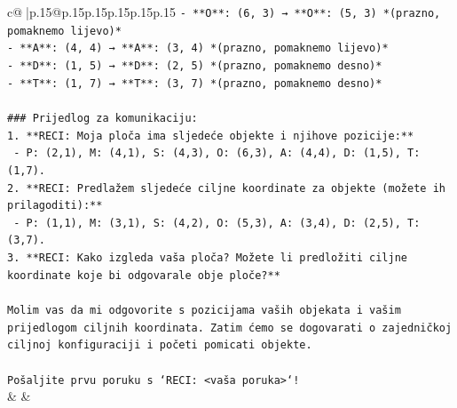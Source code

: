 \documentclass{article}
\begin{document}
{\begin{supertabular}{c@{$\;$}|p{.15\linewidth}@{}p{.15\linewidth}p{.15\linewidth}p{.15\linewidth}p{.15\linewidth}p{.15\linewidth}}
{{{\texttt{{-} **O**: (6, 3) → **O**: (5, 3) *(prazno, pomaknemo lijevo)*} \\
\texttt{{-} **A**: (4, 4) → **A**: (3, 4) *(prazno, pomaknemo lijevo)*} \\
\texttt{{-} **D**: (1, 5) → **D**: (2, 5) *(prazno, pomaknemo desno)*} \\
\texttt{{-} **T**: (1, 7) → **T**: (3, 7) *(prazno, pomaknemo desno)*} \\
\\ 
\texttt{\#\#\# Prijedlog za komunikaciju:} \\
\texttt{1. **RECI: Moja ploča ima sljedeće objekte i njihove pozicije:**} \\
\texttt{   {-} P: (2,1), M: (4,1), S: (4,3), O: (6,3), A: (4,4), D: (1,5), T: (1,7).} \\
\texttt{2. **RECI: Predlažem sljedeće ciljne koordinate za objekte (možete ih prilagoditi):**} \\
\texttt{   {-} P: (1,1), M: (3,1), S: (4,2), O: (5,3), A: (3,4), D: (2,5), T: (3,7).} \\
\texttt{3. **RECI: Kako izgleda vaša ploča? Možete li predložiti ciljne koordinate koje bi odgovarale obje ploče?**} \\
\\ 
\texttt{Molim vas da mi odgovorite s pozicijama vaših objekata i vašim prijedlogom ciljnih koordinata. Zatim ćemo se dogovarati o zajedničkoj ciljnoj konfiguraciji i početi pomicati objekte.} \\
\\ 
\texttt{Pošaljite prvu poruku s `RECI: <vaša poruka>`!} \\
            }
        }
    }
    & & \\ \\


\end{supertabular}}
\end{document}
